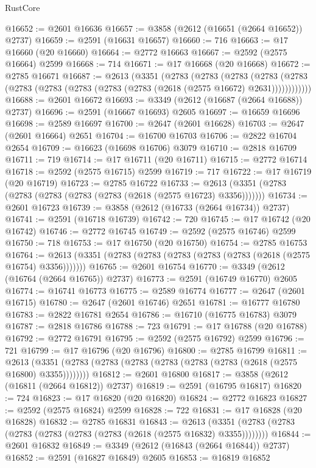 \begin{lexlean}{RustCore}
\begin{coremodule}
@16652 := @2601 @16636
@16657 := @3858 (@2612 (@16651 (@2664 @16652)) @2737)
@16659 := @2591 (@16631 @16657)
@16660 := 716
@16663 := @17 @16660 (@20 @16660)
@16664 := @2772 @16663
@16667 := @2592 (@2575 @16664) @2599
@16668 := 714
@16671 := @17 @16668 (@20 @16668)
@16672 := @2785 @16671
@16687 := @2613
    (@3351
      (@2783
        (@2783
          (@2783
            (@2783 (@2783 (@2783 (@2783 (@2783 (@2783 (@2783 (@2618 (@2575 @16672) @2631))))))))))))
@16688 := @2601 @16672
@16693 := @3349 (@2612 (@16687 (@2664 @16688)) @2737)
@16696 := @2591 (@16667 @16693) @2605
@16697 := @16659 @16696
@16698 := @2589 @16697
@16700 := @2647 (@2601 @16628)
@16703 := @2647 (@2601 @16664) @2651
@16704 := @16700 @16703
@16706 := @2822 @16704 @2654
@16709 := @16623 (@16698 @16706) @3079
@16710 := @2818 @16709
@16711 := 719
@16714 := @17 @16711 (@20 @16711)
@16715 := @2772 @16714
@16718 := @2592 (@2575 @16715) @2599
@16719 := 717
@16722 := @17 @16719 (@20 @16719)
@16723 := @2785 @16722
@16733 := @2613 (@3351 (@2783 (@2783 (@2783 (@2783 (@2783 (@2618 (@2575 @16723) @3356)))))))
@16734 := @2601 @16723
@16739 := @3858 (@2612 (@16733 (@2664 @16734)) @2737)
@16741 := @2591 (@16718 @16739)
@16742 := 720
@16745 := @17 @16742 (@20 @16742)
@16746 := @2772 @16745
@16749 := @2592 (@2575 @16746) @2599
@16750 := 718
@16753 := @17 @16750 (@20 @16750)
@16754 := @2785 @16753
@16764 := @2613 (@3351 (@2783 (@2783 (@2783 (@2783 (@2783 (@2618 (@2575 @16754) @3356)))))))
@16765 := @2601 @16754
@16770 := @3349 (@2612 (@16764 (@2664 @16765)) @2737)
@16773 := @2591 (@16749 @16770) @2605
@16774 := @16741 @16773
@16775 := @2589 @16774
@16777 := @2647 (@2601 @16715)
@16780 := @2647 (@2601 @16746) @2651
@16781 := @16777 @16780
@16783 := @2822 @16781 @2654
@16786 := @16710 (@16775 @16783) @3079
@16787 := @2818 @16786
@16788 := 723
@16791 := @17 @16788 (@20 @16788)
@16792 := @2772 @16791
@16795 := @2592 (@2575 @16792) @2599
@16796 := 721
@16799 := @17 @16796 (@20 @16796)
@16800 := @2785 @16799
@16811 := @2613 (@3351 (@2783 (@2783 (@2783 (@2783 (@2783 (@2783 (@2618 (@2575 @16800) @3355))))))))
@16812 := @2601 @16800
@16817 := @3858 (@2612 (@16811 (@2664 @16812)) @2737)
@16819 := @2591 (@16795 @16817)
@16820 := 724
@16823 := @17 @16820 (@20 @16820)
@16824 := @2772 @16823
@16827 := @2592 (@2575 @16824) @2599
@16828 := 722
@16831 := @17 @16828 (@20 @16828)
@16832 := @2785 @16831
@16843 := @2613 (@3351 (@2783 (@2783 (@2783 (@2783 (@2783 (@2783 (@2618 (@2575 @16832) @3355))))))))
@16844 := @2601 @16832
@16849 := @3349 (@2612 (@16843 (@2664 @16844)) @2737)
@16852 := @2591 (@16827 @16849) @2605
@16853 := @16819 @16852

\end{coremodule}
\end{lexlean}
